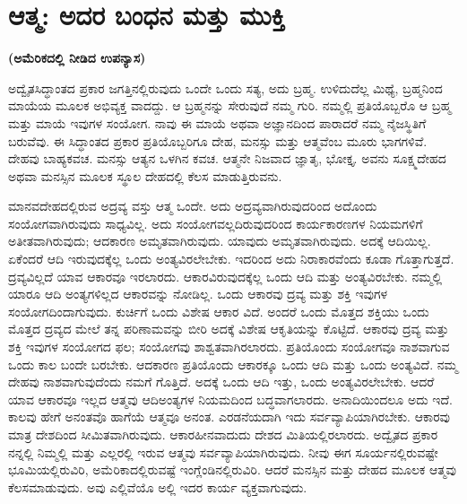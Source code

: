 \chapter{ಆತ್ಮ: ಅದರ ಬಂಧನ ಮತ್ತು ಮುಕ್ತಿ}

\centerline{\textbf{(ಅಮೆರಿಕದಲ್ಲಿ ನೀಡಿದ ಉಪನ್ಯಾಸ)}}

ಅದ್ವೈತಸಿದ್ಧಾಂತದ ಪ್ರಕಾರ ಜಗತ್ತಿನಲ್ಲಿರುವುದು ಒಂದೇ ಒಂದು ಸತ್ಯ, ಅದು ಬ್ರಹ್ಮ. ಉಳಿದುದೆಲ್ಲ ಮಿಥ್ಯೆ, ಬ್ರಹ್ಮನಿಂದ ಮಾಯೆಯ ಮೂಲಕ ಅಭಿವ್ಯಕ್ತ ವಾದದ್ದು. ಆ ಬ್ರಹ್ಮನನ್ನು ಸೇರುವುದೆ ನಮ್ಮ ಗುರಿ. ನಮ್ಮಲ್ಲಿ ಪ್ರತಿಯೊಬ್ಬರೊ ಆ ಬ್ರಹ್ಮ ಮತ್ತು ಮಾಯೆ ಇವುಗಳ ಸಂಯೋಗ. ನಾವು ಈ ಮಾಯೆ ಅಥವಾ ಅಜ್ಞಾನದಿಂದ ಪಾರಾದರೆ ನಮ್ಮ ನೈಜಸ್ಥಿತಿಗೆ ಬರುವೆವು. ಈ ಸಿದ್ಧಾಂತದ ಪ್ರಕಾರ ಪ್ರತಿಯೊಬ್ಬರಿಗೂ ದೇಹ, ಮನಸ್ಸು ಮತ್ತು ಆತ್ಮವೆಂಬ ಮೂರು ಭಾಗಗಳಿವೆ. ದೇಹವು ಬಾಹ್ಯಕವಚ. ಮನಸ್ಸು ಆತ್ಯನ ಒಳಗಿನ ಕವಚ. ಆತ್ಮನೇ ನಿಜವಾದ ಜ್ಞಾತೃ, ಭೋಕ್ತೃ. ಅವನು ಸೂಕ್ಷ್ಮದೇಹದ ಅಥವಾ ಮನಸ್ಸಿನ ಮೂಲಕ ಸ್ಥೂಲ ದೇಹದಲ್ಲಿ ಕೆಲಸ ಮಾಡುತ್ತಿರುವನು.

ಮಾನವದೇಹದಲ್ಲಿರುವ ಅದ್ರವ್ಯ ವಸ್ತು ಆತ್ಮ ಒಂದೇ. ಅದು ಅದ್ರವ್ಯವಾಗಿರುವುದರಿಂದ ಅದೊಂದು ಸಂಯೋಗವಾಗಿರುವುದು ಸಾಧ್ಯವಿಲ್ಲ. ಅದು ಸಂಯೋಗವಲ್ಲದಿರುವುದರಿಂದ ಕಾರ್ಯಕಾರಣಗಳ ನಿಯಮಗಳಿಗೆ ಅತೀತವಾಗಿರುವುದು; ಆದಕಾರಣ ಅಮೃತವಾಗಿರುವುದು. ಯಾವುದು ಅಮೃತವಾಗಿರುವುದು. ಅದಕ್ಕೆ ಆದಿಯಿಲ್ಲ. ಏಕೆಂದರೆ ಆದಿ ಇರುವುದಕ್ಕೆಲ್ಲ ಒಂದು ಅಂತ್ಯವಿರಲೇಬೇಕು. ಇದರಿಂದ ಅದು ನಿರಾಕಾರವೆಂದು ಕೂಡಾ ಗೊತ್ತಾಗುತ್ತದೆ. ದ್ರವ್ಯವಿಲ್ಲದೆ ಯಾವ ಆಕಾರವೂ ಇರಲಾರದು. ಆಕಾರವಿರುವುದಕ್ಕೆಲ್ಲ ಒಂದು ಆದಿ ಮತ್ತು ಅಂತ್ಯವಿರಬೇಕು. ನಮ್ಮಲ್ಲಿ ಯಾರೂ ಆದಿ ಅಂತ್ಯಗಳಿಲ್ಲದ ಆಕಾರವನ್ನು ನೋಡಿಲ್ಲ. ಒಂದು ಆಕಾರವು ದ್ರವ್ಯ ಮತ್ತು ಶಕ್ತಿ ಇವುಗಳ ಸಂಯೋಗದಿಂದಾಗುವುದು. ಕುರ್ಚಿಗೆ ಒಂದು ವಿಶೇಷ ಆಕಾರ ವಿದೆ. ಅಂದರೆ ಒಂದು ಮೊತ್ತದ ಶಕ್ತಿಯು ಒಂದು ಮೊತ್ತದ ದ್ರವ್ಯದ ಮೇಲೆ ತನ್ನ ಪರಿಣಾಮವನ್ನು ಬೀರಿ ಅದಕ್ಕೆ ವಿಶೇಷ ಆಕೃತಿಯನ್ನು ಕೊಟ್ಟಿದೆ. ಆಕಾರವು ದ್ರವ್ಯ ಮತ್ತು ಶಕ್ತಿ ಇವುಗಳ ಸಂಯೋಗದ ಫಲ; ಸಂಯೋಗವು ಶಾಶ್ವತವಾಗಿರಲಾರದು. ಪ್ರತಿಯೊಂದು ಸಂಯೋಗವೂ ನಾಶವಾಗುವ ಒಂದು ಕಾಲ ಬಂದೇ ಬರಬೇಕು. ಆದಕಾರಣ ಪ್ರತಿಯೊಂದು ಆಕಾರಕ್ಕೂ ಒಂದು ಆದಿ ಮತ್ತು ಒಂದು ಅಂತ್ಯವಿದೆ. ನಮ್ಮ ದೇಹವು ನಾಶವಾಗುವುದೆಂದು ನಮಗೆ ಗೊತ್ತಿದೆ. ಅದಕ್ಕೆ ಒಂದು ಆದಿ ಇತ್ತು, ಒಂದು ಅಂತ್ಯವಿರಲೇಬೇಕು. ಆದರೆ ಯಾವ ಆಕಾರವೂ ಇಲ್ಲದ ಆತ್ಮವು ಆದಿಅಂತ್ಯಗಳ ನಿಯಮದಿಂದ ಬದ್ಧವಾಗಲಾರದು. ಅನಾದಿಯಿಂದಲೂ ಅದು ಇದೆ. ಕಾಲವು ಹೇಗೆ ಅನಂತವೊ ಹಾಗೆಯೆ ಆತ್ಮವೂ ಅನಂತ. ಎರಡನೆಯದಾಗಿ ಇದು ಸರ್ವವ್ಯಾಪಿಯಾಗಿರಬೇಕು. ಆಕಾರವು ಮಾತ್ರ ದೇಶದಿಂದ ಸೀಮಿತವಾಗಿರುವುದು. ಆಕಾರಹೀನವಾದುದು ದೇಶದ ಮಿತಿಯಲ್ಲಿರಲಾರದು. ಅದ್ವೈತದ ಪ್ರಕಾರ ನನ್ನಲ್ಲಿ ನಿಮ್ಮಲ್ಲಿ ಮತ್ತು ಎಲ್ಲರಲ್ಲಿ ಇರುವ ಆತ್ಮವು ಸರ್ವವ್ಯಾಪಿಯಾಗಿರುವುದು. ನೀವು ಈಗ ಸೂರ್ಯನಲ್ಲಿರುವಷ್ಟೇ ಭೂಮಿಯಲ್ಲಿರುವಿರಿ, ಅಮೆರಿಕಾದಲ್ಲಿರುವಷ್ಟೆ ಇಂಗ್ಲೆಂಡಿನಲ್ಲಿರುವಿರಿ. ಆದರೆ ಮನಸ್ಸಿನ ಮತ್ತು ದೇಹದ ಮೂಲಕ ಆತ್ಮವು ಕೆಲಸಮಾಡುವುದು. ಅವು ಎಲ್ಲಿವೆಯೊ ಅಲ್ಲಿ ಇದರ ಕಾರ್ಯ ವ್ಯಕ್ತವಾಗುವುದು.

